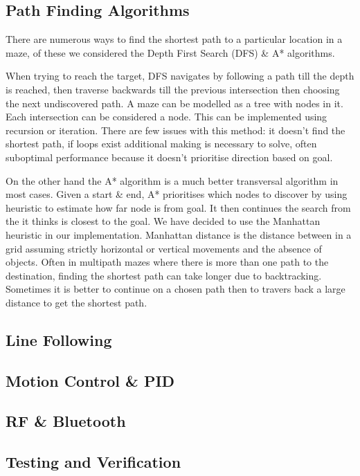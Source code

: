 \documentclass{article}
\begin{document}
\subsection{Path Finding Algorithms}

There are numerous ways to find the shortest path to a particular location in a maze, of these we considered the Depth First Search (DFS) \& A* algorithms.

When trying to reach the target, DFS navigates by following a path till the depth is reached, then traverse backwards till the previous intersection then choosing the next undiscovered path. A maze can be modelled as a tree with nodes in it. Each intersection can be considered a node. This can be implemented using recursion or iteration. There are few issues with this method: it doesn't find the shortest path, if loops exist additional making is necessary to solve, often suboptimal performance because it doesn't prioritise direction based on goal.

On the other hand the A* algorithm is a much better transversal algorithm in most cases. Given a start \& end, A* prioritises which nodes to discover by using heuristic to estimate how far node is from goal. It then continues the search from the it thinks is closest to the goal. We have decided to use the Manhattan heuristic in our implementation. Manhattan distance is the distance between in a grid assuming strictly horizontal or vertical movements and the absence of objects. Often in multipath mazes where there is more than one path to the destination, finding the shortest path can take longer due to backtracking. Sometimes it is better to continue on a chosen path then to travers back a large distance to get the shortest path.

\subsection{Line Following}

\subsection{Motion Control \& PID}

\subsection{RF \& Bluetooth}

\subsection{Testing and Verification}
\end{document}

